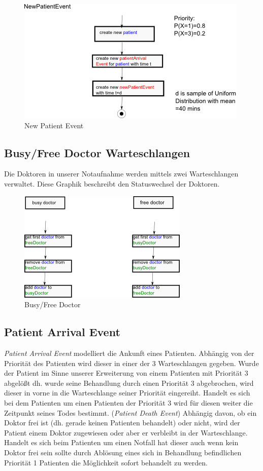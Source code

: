 \documentclass[12pt,fleqn,a4paper]{article}
\begin{document}
\begin{figure}[h]
	\centering
  	\includegraphics{img/NewPatientEvent}
  	\caption{New Patient Event}
\end{figure}

\subsection{Busy/Free Doctor Warteschlangen}
Die Doktoren in unserer Notaufnahme werden mittels zwei Warteschlangen verwaltet. Diese Graphik beschreibt den Statuswechsel der Doktoren.

\begin{figure}[h]
	\centering
	\includegraphics{img/freeDoctor}
	\caption{Busy/Free Doctor}
\end{figure}


\newpage
\subsection{Patient Arrival Event}
\textit{Patient Arrival Event} modelliert die Ankunft eines Patienten.
Abh\"{a}ngig von der Priorit\"{a}t des Patienten wird dieser in einer der 3 Warteschlangen gegeben. Wurde der Patient im Sinne unserer Erweiterung von einem Patienten mit Priorit\"{a}t 3 abgel\"{o}\ss t dh. wurde seine Behandlung durch einen Priorit\"{a}t 3 abgebrochen, wird dieser in vorne in die Warteschlange seiner Priorit\"{a}t eingereiht. Handelt es sich bei dem Patienten um einen Patienten der Priorit\"{a}t 3 wird f\"{u}r diesen weiter die Zeitpunkt seines Todes bestimmt. (\textit{Patient Death Event})
Abh\"{a}ngig davon, ob ein Doktor frei ist (dh. gerade keinen Patienten behandelt) oder nicht, wird der Patient einem Doktor zugewiesen oder aber er verbleibt in der Warteschlange.
Handelt es sich beim Patienten um einen Notfall hat dieser auch wenn kein Doktor frei sein sollte durch Abl\"{o}sung eines sich in Behandlung befindlichen Priorit\"{a}t 1 Patienten die M\"{o}glichkeit sofort behandelt zu werden.
\end{document}

